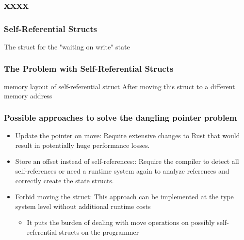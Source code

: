 \subsection{xxxx} %
\begin{frame}[fragile]
    \frametitle{Self-Referential Structs}
% 
% 
% 
% 
% 
The struct for the "waiting on write" state

% 
\end{frame}
\begin{frame}[fragile]
    \frametitle{The Problem with Self-Referential Structs}
% 
% 
{\color{red}memory layout of self-referential struct}
% 
% 
{\color{red}After moving this struct to a different memory address}
% 
% 
\end{frame}
\begin{frame}[fragile]
    \frametitle{Possible approaches to solve the dangling pointer problem}
% 
% 
    \begin{itemize}
        \item {\color{red}Update the pointer on move:} Require extensive changes to Rust that would result in potentially huge  performance losses.
        \item {\color{red}Store an offset instead of self-references:}: Require the compiler to {\color{red}detect all self-references} or need a runtime system again to analyze references and correctly create the  state structs.
        \item {\color{red}Forbid moving the struct:} This approach can be implemented at the type system level without additional  runtime costs
    	\begin{itemize}
    	    \item It puts the burden of dealing with  move operations on possibly self-referential structs on the programmer
    	\end{itemize}
    \end{itemize}

\end{frame}
